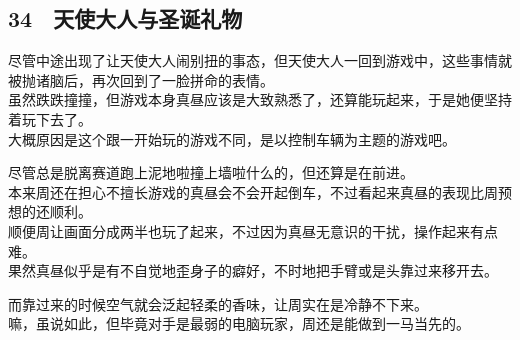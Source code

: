 \subsection{34　天使大人与圣诞礼物}

尽管中途出现了让天使大人闹别扭的事态，但天使大人一回到游戏中，这些事情就被抛诸脑后，再次回到了一脸拼命的表情。\\

虽然跌跌撞撞，但游戏本身真昼应该是大致熟悉了，还算能玩起来，于是她便坚持着玩下去了。\\

大概原因是这个跟一开始玩的游戏不同，是以控制车辆为主题的游戏吧。

尽管总是脱离赛道跑上泥地啦撞上墙啦什么的，但还算是在前进。\\

本来周还在担心不擅长游戏的真昼会不会开起倒车，不过看起来真昼的表现比周预想的还顺利。\\

顺便周让画面分成两半也玩了起来，不过因为真昼无意识的干扰，操作起来有点难。\\

果然真昼似乎是有不自觉地歪身子的癖好，不时地把手臂或是头靠过来移开去。

而靠过来的时候空气就会泛起轻柔的香味，让周实在是冷静不下来。\\

嘛，虽说如此，但毕竟对手是最弱的电脑玩家，周还是能做到一马当先的。\\


